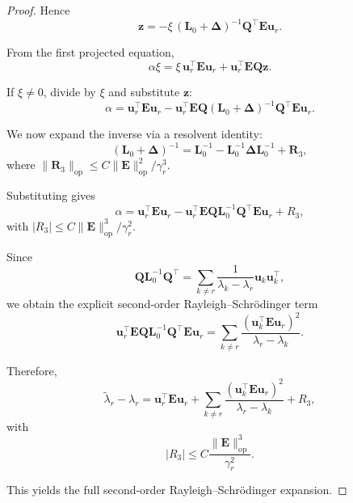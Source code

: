 \documentclass[10pt,a4paper]{amsart}
\newcommand{\op}{\mathrm{op}}
\begin{document}
\begin{proof}
Hence
\[
\mathbf{z}
=
-\xi\,(\mathbf{L}_0+\mathbf{\Delta})^{-1}
\mathbf{Q}^\top\mathbf{E}\mathbf{u}_r.
\]

From the first projected equation,
\[
\alpha\xi
=
\xi\,\mathbf{u}_r^\top\mathbf{E}\mathbf{u}_r
+
\mathbf{u}_r^\top\mathbf{E}\mathbf{Q}\mathbf{z}.
\]

If $\xi\neq0$, divide by $\xi$ and substitute $\mathbf{z}$:
\[
\alpha
=
\mathbf{u}_r^\top\mathbf{E}\mathbf{u}_r
-
\mathbf{u}_r^\top\mathbf{E}\mathbf{Q}
(\mathbf{L}_0+\mathbf{\Delta})^{-1}
\mathbf{Q}^\top\mathbf{E}\mathbf{u}_r.
\]

We now expand the inverse via a resolvent identity:
\[
(\mathbf{L}_0+\mathbf{\Delta})^{-1}
=
\mathbf{L}_0^{-1}
-
\mathbf{L}_0^{-1}\mathbf{\Delta}\mathbf{L}_0^{-1}
+
\mathbf{R}_3,
\]
where
\(
\|\mathbf{R}_3\|_{\op}
\le C \|\mathbf{E}\|_{\op}^2/\gamma_r^3.
\)

Substituting gives
\[
\alpha
=
\mathbf{u}_r^\top\mathbf{E}\mathbf{u}_r
-
\mathbf{u}_r^\top\mathbf{E}\mathbf{Q}
\mathbf{L}_0^{-1}
\mathbf{Q}^\top\mathbf{E}\mathbf{u}_r
+
R_3,
\]
with
\(
|R_3|
\le C\|\mathbf{E}\|_{\op}^3/\gamma_r^2.
\)

Since
\[
\mathbf{Q}\mathbf{L}_0^{-1}\mathbf{Q}^\top
=
\sum_{k\ne r}
\frac{1}{\lambda_k-\lambda_r}
\mathbf{u}_k\mathbf{u}_k^\top,
\]
we obtain the explicit second-order Rayleigh–Schrödinger term
\[
\mathbf{u}_r^\top\mathbf{E}\mathbf{Q}
\mathbf{L}_0^{-1}
\mathbf{Q}^\top\mathbf{E}\mathbf{u}_r
=
\sum_{k\ne r}
\frac{(\mathbf{u}_k^\top\mathbf{E}\mathbf{u}_r)^2}
{\lambda_r-\lambda_k}.
\]

Therefore,
\[
\widetilde{\lambda}_r-\lambda_r
=
\mathbf{u}_r^\top\mathbf{E}\mathbf{u}_r
+
\sum_{k\ne r}
\frac{(\mathbf{u}_k^\top\mathbf{E}\mathbf{u}_r)^2}
{\lambda_r-\lambda_k}
+
R_3,
\]
with
\[
|R_3|
\le
C\frac{\|\mathbf{E}\|_{\op}^3}{\gamma_r^2}.
\]

This yields the full second-order Rayleigh–Schrödinger expansion.
\end{proof}
\end{document}
